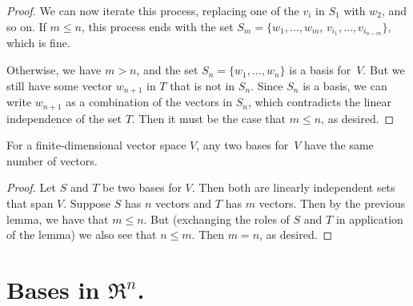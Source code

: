 \begin{proof}
We can now iterate this process, replacing one of the $v_i$ in $S_1$ with $w_2$, and so on.  If $m\leq n$, this process ends with the set $S_m=\{w_1,\ldots, w_m$, $v_{i_1},\ldots,v_{i_{n-m}}  \}$, which is fine.

Otherwise, we have $m>n$, and the set $S_n=\{w_1,\ldots, w_n \}$ is a basis for~$V$.  But we still have some vector 
$w_{n+1}$  in $T$ that is not in $S_n$.  Since $S_n$ is a basis, we can write $w_{n+1}$ as a combination of the vectors in $S_n$, which contradicts the linear independence of the set $T$.  Then it must be the case that $m\leq n$, as desired.
\end{proof}


\begin{corollary}\label{corsame}
For a finite-dimensional vector space $V$, any two bases for~$V$ have the same number of vectors.
\end{corollary}

\begin{proof}
Let $S$ and $T$ be two bases for $V$.  Then both are linearly independent sets that span $V$.  Suppose $S$ has $n$ vectors and $T$ has $m$ vectors.  Then by the previous lemma, we have that $m\leq n$.  But (exchanging the roles of $S$ and $T$ in application of the lemma) we also see that $n\leq m$.  Then $m=n$, as desired.
\end{proof}


\section{Bases in $\Re^n$.}


